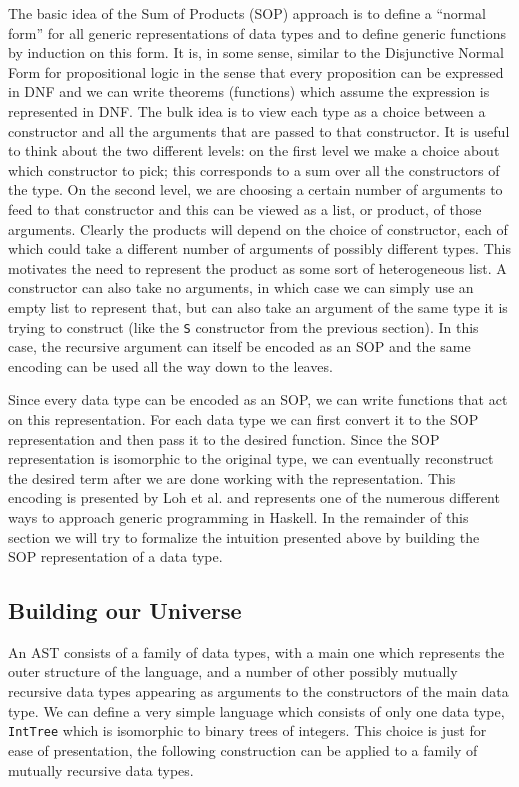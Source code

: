 \documentclass[11pt, titlepage]{article}
\begin{document}
The basic idea of the Sum of Products (SOP) approach is to define a ``normal form'' for all generic representations of data types and 
to define generic functions by induction on this form. It is, in some sense, similar to the Disjunctive Normal Form for propositional logic in the sense that every proposition can be expressed in DNF and we can write theorems (functions) which assume the expression is represented in DNF.
The bulk idea is to view each type as a choice between a constructor and all the arguments that are passed to that constructor. It is useful to think about the two different levels: on the first level we make a choice about which constructor to pick; this corresponds to a sum
over all the constructors of the type. On the second level, we are choosing a certain number of arguments to feed to that constructor and this can be viewed as a list, or product, of 
those arguments. Clearly the products will depend on the choice of constructor, 
each of which could take a different number of arguments of possibly 
different types. This motivates the need to represent the product as some sort 
of heterogeneous list. A constructor can also take no arguments, in which case we 
can simply use an empty list to represent that, but can also take an argument of the same type it is trying to construct (like the \texttt{S} constructor from the previous section). 
In this case, the recursive argument can itself be encoded as an SOP and the same encoding can be used all the way down to the leaves. 

Since every data type can be encoded as an SOP, we can write functions 
that act on this representation. For each data type 
we can first convert it to the SOP representation and then pass it to 
the desired function. Since the SOP representation is isomorphic to the original type, we can eventually reconstruct the 
desired term after we are done working with the representation. This encoding is 
presented by Loh et al. \cite{true-sop} and represents one of the numerous different ways to 
approach generic programming in Haskell. 
In the remainder of this section we will try to formalize the intuition presented 
above by building the SOP representation of a data type. 

\subsection{Building our Universe}\label{universe}

An AST consists of a family of data types, with a main one which
represents the outer structure of the language, and a number of other
possibly mutually recursive data types appearing as arguments to the
constructors of the main data type. We can define a very simple language which 
consists of only one data type, \texttt{IntTree} which is isomorphic to binary trees 
of integers. This choice is just for ease of presentation, the following construction 
can be applied to a family of mutually recursive data types.
\end{document}
